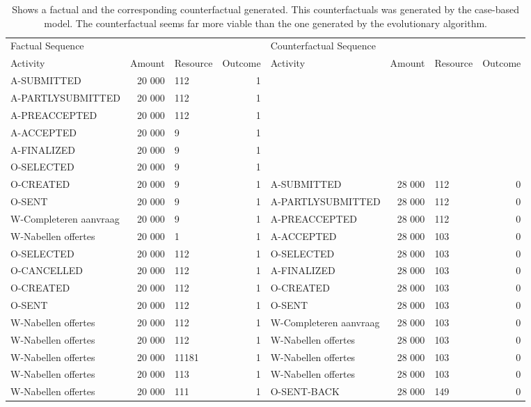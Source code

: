 \begin{table}
\caption{Shows a factual and the corresponding counterfactual generated. This counterfactuals was generated by the case-based model. The counterfactual seems far more viable than the one generated by the evolutionary algorithm.}
\label{tbl:example-cf-cbg}
\begin{tabular}{lrlrlrlr}
\toprule
\multicolumn{4}{l}{Factual Sequence} & \multicolumn{4}{l}{Counterfactual Sequence} \\
Activity & Amount & Resource & Outcome & Activity & Amount & Resource & Outcome \\
\midrule
A-SUBMITTED & 20 000 & 112 & 1 &  &  &  &  \\
A-PARTLYSUBMITTED & 20 000 & 112 & 1 &  &  &  &  \\
A-PREACCEPTED & 20 000 & 112 & 1 &  &  &  &  \\
A-ACCEPTED & 20 000 & 9 & 1 &  &  &  &  \\
A-FINALIZED & 20 000 & 9 & 1 &  &  &  &  \\
O-SELECTED & 20 000 & 9 & 1 &  &  &  &  \\
O-CREATED & 20 000 & 9 & 1 & A-SUBMITTED & 28 000 & 112 & 0 \\
O-SENT & 20 000 & 9 & 1 & A-PARTLYSUBMITTED & 28 000 & 112 & 0 \\
W-Completeren aanvraag & 20 000 & 9 & 1 & A-PREACCEPTED & 28 000 & 112 & 0 \\
W-Nabellen offertes & 20 000 & 1 & 1 & A-ACCEPTED & 28 000 & 103 & 0 \\
O-SELECTED & 20 000 & 112 & 1 & O-SELECTED & 28 000 & 103 & 0 \\
O-CANCELLED & 20 000 & 112 & 1 & A-FINALIZED & 28 000 & 103 & 0 \\
O-CREATED & 20 000 & 112 & 1 & O-CREATED & 28 000 & 103 & 0 \\
O-SENT & 20 000 & 112 & 1 & O-SENT & 28 000 & 103 & 0 \\
W-Nabellen offertes & 20 000 & 112 & 1 & W-Completeren aanvraag & 28 000 & 103 & 0 \\
W-Nabellen offertes & 20 000 & 112 & 1 & W-Nabellen offertes & 28 000 & 103 & 0 \\
W-Nabellen offertes & 20 000 & 11181 & 1 & W-Nabellen offertes & 28 000 & 103 & 0 \\
W-Nabellen offertes & 20 000 & 113 & 1 & W-Nabellen offertes & 28 000 & 103 & 0 \\
W-Nabellen offertes & 20 000 & 111 & 1 & O-SENT-BACK & 28 000 & 149 & 0 \\

\end{tabular}
\end{table}
